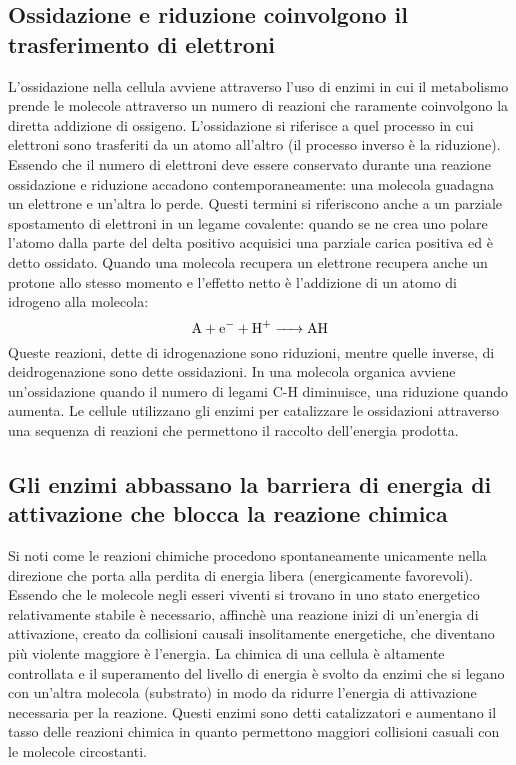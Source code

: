 \subsection{Ossidazione e riduzione coinvolgono il trasferimento di elettroni}
L'ossidazione nella cellula avviene attraverso l'uso di enzimi in cui il metabolismo prende le molecole attraverso un numero di reazioni che raramente coinvolgono la diretta addizione 
di ossigeno. L'ossidazione si riferisce a quel processo in cui elettroni sono trasferiti da un atomo all'altro (il processo inverso \`e la riduzione). Essendo che il numero di elettroni
deve essere conservato durante una reazione ossidazione e riduzione accadono contemporaneamente: una molecola guadagna un elettrone e un'altra lo perde. Questi termini si riferiscono
anche a un parziale spostamento di elettroni in un legame covalente: quando se ne crea uno polare l'atomo dalla parte del delta positivo acquisici una parziale carica positiva ed \`e
detto ossidato. Quando una molecola recupera un elettrone recupera anche un protone allo stesso momento e l'effetto netto \`e l'addizione di un atomo di idrogeno alla molecola:
$$\ce{A + e- + H+ -> AH}$$
Queste reazioni, dette di idrogenazione sono riduzioni, mentre quelle inverse, di deidrogenazione sono dette ossidazioni. In una molecola organica avviene un'ossidazione quando il numero
di legami C-H diminuisce, una riduzione quando aumenta. Le cellule utilizzano gli enzimi per catalizzare le ossidazioni attraverso una sequenza di reazioni che permettono il raccolto
dell'energia prodotta. 
\subsection{Gli enzimi abbassano la barriera di energia di attivazione che blocca la reazione chimica}
Si noti come le reazioni chimiche procedono spontaneamente unicamente nella direzione che porta alla perdita di energia libera (energicamente favorevoli). Essendo che le molecole negli
esseri viventi si trovano in uno stato energetico relativamente stabile \`e necessario, affinch\`e una reazione inizi di un'energia di attivazione, creato da collisioni causali
insolitamente energetiche, che diventano pi\`u violente maggiore \`e l'energia. La chimica di una cellula \`e altamente controllata e il superamento del livello di energia \`e svolto da 
enzimi che si legano con un'altra molecola (substrato) in modo da ridurre l'energia di attivazione necessaria per la reazione. Questi enzimi sono detti catalizzatori e aumentano il 
tasso delle reazioni chimica in quanto permettono maggiori collisioni casuali con le molecole circostanti. 
